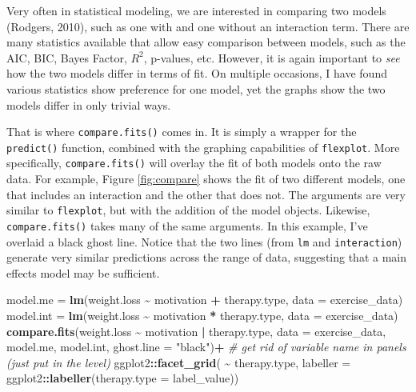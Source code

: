 \documentclass[
  english,
  man]{apa6}
\newenvironment{Shaded}{\begin{snugshade}}{\end{snugshade}}
\newcommand{\CommentTok}[1]{\textcolor[rgb]{0.56,0.35,0.01}{\textit{#1}}}
\newcommand{\DataTypeTok}[1]{\textcolor[rgb]{0.13,0.29,0.53}{#1}}
\newcommand{\KeywordTok}[1]{\textcolor[rgb]{0.13,0.29,0.53}{\textbf{#1}}}
\newcommand{\NormalTok}[1]{#1}
\newcommand{\OperatorTok}[1]{\textcolor[rgb]{0.81,0.36,0.00}{\textbf{#1}}}
\newcommand{\StringTok}[1]{\textcolor[rgb]{0.31,0.60,0.02}{#1}}
\begin{document}
Very often in statistical modeling, we are interested in comparing two models (Rodgers, 2010), such as one with and one without an interaction term. There are many statistics available that allow easy comparison between models, such as the AIC, BIC, Bayes Factor, \(R^2\), p-values, etc. However, it is again important to \emph{see} how the two models differ in terms of fit. On multiple occasions, I have found various statistics show preference for one model, yet the graphs show the two models differ in only trivial ways.

That is where \texttt{compare.fits()} comes in. It is simply a wrapper for the \texttt{predict()} function, combined with the graphing capabilities of \texttt{flexplot}. More specifically, \texttt{compare.fits()} will overlay the fit of both models onto the raw data. For example, Figure \ref{fig:compare} shows the fit of two different models, one that includes an interaction and the other that does not. The arguments are very similar to \texttt{flexplot}, but with the addition of the model objects. Likewise, \texttt{compare.fits()} takes many of the same arguments. In this example, I've overlaid a black ghost line. Notice that the two lines (from \texttt{lm} and \texttt{interaction}) generate very similar predictions across the range of data, suggesting that a main effects model may be sufficient.

\small

\begin{Shaded}
\begin{Highlighting}[]
\NormalTok{model.me =}\StringTok{ }\KeywordTok{lm}\NormalTok{(weight.loss }\OperatorTok{\textasciitilde{}}\StringTok{ }\NormalTok{motivation }\OperatorTok{+}\StringTok{ }\NormalTok{therapy.type, }\DataTypeTok{data =}\NormalTok{ exercise\_data)}
\NormalTok{model.int =}\StringTok{ }\KeywordTok{lm}\NormalTok{(weight.loss }\OperatorTok{\textasciitilde{}}\StringTok{ }\NormalTok{motivation }\OperatorTok{*}\StringTok{ }\NormalTok{therapy.type, }\DataTypeTok{data =}\NormalTok{ exercise\_data)}
\KeywordTok{compare.fits}\NormalTok{(weight.loss }\OperatorTok{\textasciitilde{}}\StringTok{ }\NormalTok{motivation }\OperatorTok{|}\StringTok{ }\NormalTok{therapy.type, }
             \DataTypeTok{data =}\NormalTok{ exercise\_data, model.me, model.int, }\DataTypeTok{ghost.line =} \StringTok{"black"}\NormalTok{)}\OperatorTok{+}
\StringTok{  }\CommentTok{\# get rid of variable name in panels (just put in the level)}
\StringTok{      }\NormalTok{ggplot2}\OperatorTok{::}\KeywordTok{facet\_grid}\NormalTok{( }\OperatorTok{\textasciitilde{}}\StringTok{ }\NormalTok{therapy.type, }
          \DataTypeTok{labeller =}\NormalTok{ ggplot2}\OperatorTok{::}\KeywordTok{labeller}\NormalTok{(}\DataTypeTok{therapy.type =}\NormalTok{ label\_value))}
\end{Highlighting}
\end{Shaded}
\end{document}
